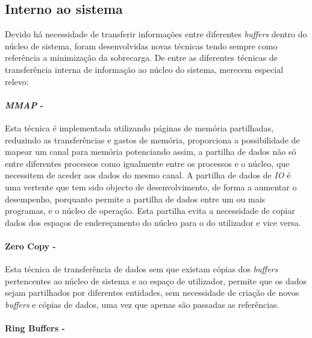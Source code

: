 \subsection{Interno ao sistema}

Devido há necessidade de transferir informações entre diferentes \textit{buffers} dentro do núcleo de sistema, foram desenvolvidas novas técnicas tendo sempre como referência a minimização da sobrecarga.
De entre as diferentes técnicas de transferência interna de informação ao núcleo do sistema, merecem especial relevo:

\paragraph*{\textit{MMAP} - }

Esta técnica é implementada utilizando páginas de memória partilhadas, reduzindo as transferências e gastos de memória, proporciona a possibilidade de mapear um canal para memória potenciando assim, a partilha de dados não só entre diferentes processos como igualmente entre os processos e o núcleo, que necessitem de aceder aos dados do mesmo canal.
A partilha de dados de \textit{IO} é uma vertente que tem sido objecto de desenvolvimento, de forma a aumentar o desempenho, porquanto permite a partilha de dados entre um ou mais programas, e o núcleo de operação.
Esta partilha evita a necessidade de copiar dados dos espaços de endereçamento do núcleo para o do utilizador e vice versa.

\paragraph*{Zero Copy - }

Esta técnica de transferência de dados sem que existam cópias dos \textit{buffers} pertencentes ao núcleo de sistema e ao espaço de utilizador, permite que os dados sejam partilhados por diferentes entidades, sem necessidade de criação de novos \textit{buffers} e cópias de dados, uma vez que apenas são passadas as referências.

\paragraph*{Ring Buffers - }

